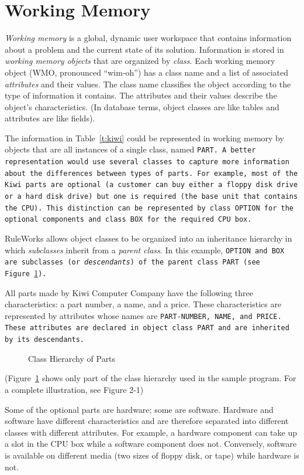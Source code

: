 \section{Working Memory}

\emph{Working memory} is a global, dynamic user workspace that
contains information about a problem and the current state of its
solution. Information is stored in \emph{working memory objects} that
are organized by \emph{class}.  Each working memory object (WMO,
pronounced ``wim-oh'') has a class name and a list of associated
\emph{attributes} and their values. The class name classifies the
object according to the type of information it contains. The
attributes and their values describe the object's characteristics. (In
database terms, object classes are like tables and attributes are like
fields).

The information in Table~\ref{t:kiwi} could be represented in working
memory by objects that are all instances of a single class, named
\tt{PART}. A better representation would use several classes to
capture more information about the differences between types of
parts. For example, most of the Kiwi parts are optional (a customer
can buy either a floppy disk drive or a hard disk drive) but one is
required (the base unit that contains the CPU). This distinction can
be represented by class \tt{OPTION} for the optional components and
class \tt{BOX} for the required CPU box.

RuleWorks allows object classes to be organized into an inheritance
hierarchy in which \emph{subclasses} inherit from a \emph{parent
  class}. In this example, \tt{OPTION} and \tt{BOX} are subclasses (or
\emph{descendants}) of the parent class \tt{PART} (see Figure~\ref{f:1-1}).

All parts made by Kiwi Computer Company have the following three
characteristics: a part number, a name, and a price. These
characteristics are represented by attributes whose names are
\tt{PART-NUMBER}, \tt{NAME}, and \tt{PRICE}. These attributes are
declared in object class \tt{PART} and are inherited by its
descendants.

\begin{figure}
  \centering
  
  \caption{Class Hierarchy of Parts}
  \label{f:1-1}
\end{figure}

(Figure~\ref{f:1-1} shows only part of the class hierarchy used in the
sample program. For a complete illustration, see Figure 2-1)

Some of the optional parts are hardware; some are software. Hardware
and software have different characteristics and are therefore
separated into different classes with different attributes. For
example, a hardware component can take up a slot in the CPU box while
a software component does not.  Conversely, software is available on
different media (two sizes of floppy disk, or tape) while hardware is
not.

